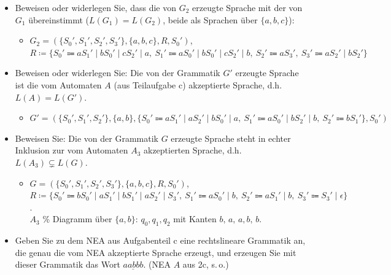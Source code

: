 \begin{itemize}
    \item Beweisen oder widerlegen Sie, dass die von $G_2$ erzeugte Sprache mit der von $G_1$ übereinstimmt
    ($L(G_1)=L(G_2)$, beide als Sprachen über $\{a,b,c\}$):
    \begin{itemize}
        \item  $G_2=(\{S_0',S_1',S_2',S_3'\},\{a,b,c\},R,S_0')$,\\
        $R\coloneqq\{S_0'\Coloneqq aS_1'\mid bS_0'\mid cS_2'\mid a,\ S_1'\Coloneqq aS_0'\mid bS_0'\mid cS_2'\mid b,\ S_2'\Coloneqq aS_3',\ S_3'\Coloneqq aS_2'\mid bS_2'\}$ 
    \end{itemize}
    \item Beweisen oder widerlegen Sie: Die von der Grammatik $G'$ erzeugte Sprache ist die vom Automaten $A$
    (aus Teilaufgabe c) akzeptierte Sprache, d.h.\ $L(A)=L(G')$.
    \begin{itemize}
        \item
        $G'=(\{S_0',S_1',S_2'\},\{a,b\},\{S_0'\Coloneqq aS_1'\mid aS_2'\mid bS_0'\mid a,\ S_1'\Coloneqq aS_0'\mid bS_2'\mid b,\ S_2'\Coloneqq bS_1'\},S_0')$ 
    \end{itemize}
    \item Beweisen Sie: Die von der Grammatik $G$ erzeugte Sprache steht in echter Inklusion zur vom Automaten
    $A_3$ akzeptierten Sprache, d.h.\ $L(A_3)\subsetneq L(G)$.
    \begin{itemize}
        \item $G=(\{S_0',S_1',S_2',S_3'\},\{a,b,c\},R,S_0')$,\\
        $R\coloneqq\{S_0'\Coloneqq bS_0'\mid aS_1'\mid bS_1'\mid aS_2'\mid S_3',\ S_1'\Coloneqq aS_0'\mid b,\ S_2'\Coloneqq aS_1'\mid b,\ S_3'\Coloneqq S_3'\mid\epsilon\}$.\\
        $A_3$ \% Diagramm über $\{a,b\}$: $q_0,q_1,q_2$ mit Kanten $b,\,a,\,a,b,\,b$. 
    \end{itemize}
    \item Geben Sie zu dem NEA aus Aufgabenteil c eine rechtslineare Grammatik an, die genau die vom NEA
    akzeptierte Sprache erzeugt, und erzeugen Sie mit dieser Grammatik das Wort $\underline{aabbb}$.  (NEA $A$ aus 2c, s.\,o.)
\end{itemize}

